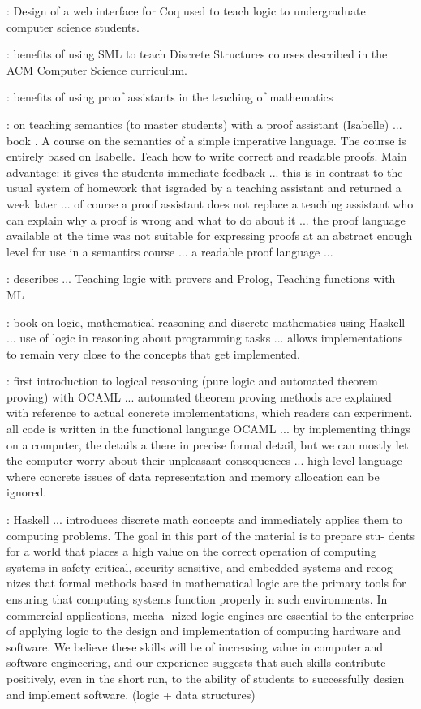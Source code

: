 \documentclass[submission,copyright,creativecommons]{eptcs}
\begin{document}
\cite{hendriks-adn10}: Design of a web interface for Coq used to teach
logic to undergraduate computer science students. 

\cite{oai:CiteSeerXPSU:10.1.1.19.3780} : benefits of using SML to
teach Discrete Structures courses described in the ACM Computer
Science curriculum.


\cite{narboux:inria-00495952} : benefits of using proof assistants in
the teaching of mathematics


\cite{Nipkow-VMCAI12} : on teaching semantics (to master students)  with a proof assistant
(Isabelle) ... book \cite{NKtoappear}. A course on the semantics of a
simple imperative language. The course is entirely based on
Isabelle. Teach how to write correct and readable proofs. Main
advantage: it gives the students immediate feedback ... this is in
contrast to the usual system of homework that isgraded by a teaching
assistant and returned a week later ... of course a proof assistant
does not replace a teaching assistant who can explain why a proof is
wrong and what to do about it ... the proof language available at the
time was not suitable for expressing proofs at an abstract enough
level for use in a semantics course ... a readable proof language ... 


\cite{Henderson02}: describes ... Teaching logic with provers and Prolog, Teaching
functions with ML

\cite{Doets04} : book on logic, mathematical reasoning and discrete
mathematics using Haskell ... use of logic in reasoning about
programming tasks ... allows implementations to remain very
close to the concepts that get implemented.


\cite{Harrison09} : first introduction to logical reasoning (pure
logic and automated theorem proving) with  OCAML ... automated theorem
proving methods are explained with reference to actual concrete
implementations, which readers can experiment. all code is written in
the functional language OCAML ... by implementing things on a
computer, the details a there in precise formal detail, but we can
mostly let the computer worry about their unpleasant consequences
... high-level language where concrete issues of data representation
and memory allocation can be ignored.


\cite{books/daglib/0007497} : Haskell ... introduces discrete math
concepts and immediately applies them to computing problems.
The goal in this part of the material is to prepare stu- dents for a
world that places a high value on the correct operation of computing
systems in safety-critical, security-sensitive, and embedded systems
and recog- nizes that formal methods based in mathematical logic are
the primary tools for ensuring that computing systems function
properly in such environments. 
In commercial applications, mecha- nized logic engines are essential
to the enterprise of applying logic to the design and implementation
of computing hardware and software. We believe these skills will be of
increasing value in computer and software engineering, and our
experience suggests that such skills contribute positively, even in
the short run, to the ability of students to successfully design and
implement software. (logic + data structures)
\end{document}
